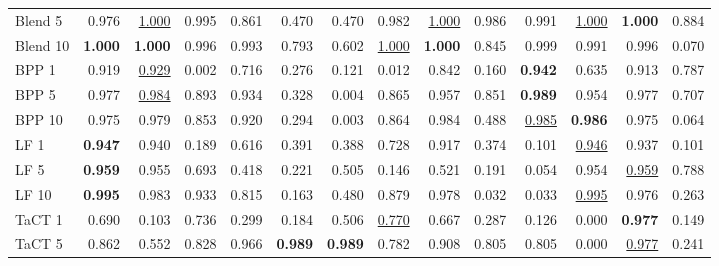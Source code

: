 \begin{table}[htbp]
\begin{adjustbox}{max width=\textwidth}
\begin{tabular}{lrrrrrrrrrrrrr}
Blend 5 & 0.976 & \underline{1.000} & 0.995 & 0.861 & \textcolor{black!45}{0.470} & \textcolor{black!45}{0.470} & 0.982 & \underline{1.000} & 0.986 & 0.991 & \underline{1.000} & \textbf{1.000} & 0.884 \\
Blend 10 & \textbf{1.000} & \textbf{1.000} & 0.996 & 0.993 & 0.793 & 0.602 & \underline{1.000} & \textbf{1.000} & 0.845 & 0.999 & 0.991 & 0.996 & \textcolor{black!45}{0.070} \\
BPP 1 & 0.919 & \underline{0.929} & \textcolor{black!45}{0.002} & 0.716 & \textcolor{black!45}{0.276} & \textcolor{black!45}{0.121} & \textcolor{black!45}{0.012} & 0.842 & \textcolor{black!45}{0.160} & \textbf{0.942} & 0.635 & 0.913 & 0.787 \\
BPP 5 & 0.977 & \underline{0.984} & 0.893 & 0.934 & \textcolor{black!45}{0.328} & \textcolor{black!45}{0.004} & 0.865 & 0.957 & 0.851 & \textbf{0.989} & 0.954 & 0.977 & 0.707 \\
BPP 10 & 0.975 & 0.979 & 0.853 & 0.920 & \textcolor{black!45}{0.294} & \textcolor{black!45}{0.003} & 0.864 & 0.984 & \textcolor{black!45}{0.488} & \underline{0.985} & \textbf{0.986} & 0.975 & \textcolor{black!45}{0.064} \\
LF 1 & \textbf{0.947} & 0.940 & \textcolor{black!45}{0.189} & 0.616 & \textcolor{black!45}{0.391} & \textcolor{black!45}{0.388} & 0.728 & 0.917 & \textcolor{black!45}{0.374} & \textcolor{black!45}{0.101} & \underline{0.946} & 0.937 & \textcolor{black!45}{0.101} \\
LF 5 & \textbf{0.959} & 0.955 & 0.693 & \textcolor{black!45}{0.418} & \textcolor{black!45}{0.221} & 0.505 & \textcolor{black!45}{0.146} & 0.521 & \textcolor{black!45}{0.191} & \textcolor{black!45}{0.054} & 0.954 & \underline{0.959} & 0.788 \\
LF 10 & \textbf{0.995} & 0.983 & 0.933 & 0.815 & \textcolor{black!45}{0.163} & \textcolor{black!45}{0.480} & 0.879 & 0.978 & \textcolor{black!45}{0.032} & \textcolor{black!45}{0.033} & \underline{0.995} & 0.976 & \textcolor{black!45}{0.263} \\
TaCT 1 & 0.690 & \textcolor{black!45}{0.103} & 0.736 & \textcolor{black!45}{0.299} & \textcolor{black!45}{0.184} & 0.506 & \underline{0.770} & 0.667 & \textcolor{black!45}{0.287} & \textcolor{black!45}{0.126} & \textcolor{black!45}{0.000} & \textbf{0.977} & \textcolor{black!45}{0.149} \\
TaCT 5 & 0.862 & 0.552 & 0.828 & 0.966 & \textbf{0.989} & \textbf{0.989} & 0.782 & 0.908 & 0.805 & 0.805 & \textcolor{black!45}{0.000} & \underline{0.977} & \textcolor{black!45}{0.241} \\

\end{tabular}
\end{adjustbox}
\end{table}
